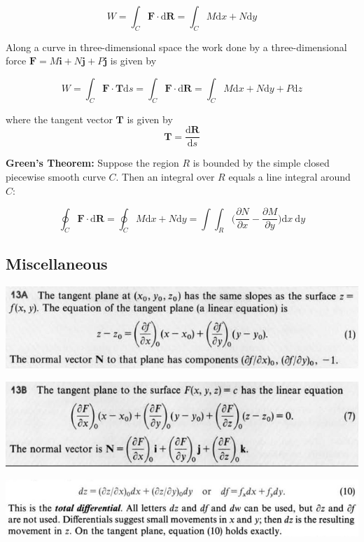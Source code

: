 \documentclass{article}
\begin{document}
\[
W = \int_C \boldsymbol{F} \cdot \text{d}\boldsymbol{R} = \int_C M \text{d}x + N \text{d} y
\]

Along a curve in three-dimensional space the work done by a three-dimensional force \(\boldsymbol{F} = M\boldsymbol{i} + N \boldsymbol{j} + P \boldsymbol{j}\) is given by

\[
W = \int_C \boldsymbol{F} \cdot \boldsymbol{T} \text{d}s = \int_C \boldsymbol{F} \cdot \text{d}\boldsymbol{R} = \int_C M \text{d}x + N \text{d}y + P \text{d}z
\]

where the tangent vector \(\boldsymbol{T}\) is given by \[\boldsymbol{T} = \frac{\text{d}\boldsymbol{R}}{\text{d}s}\]

\textbf{Green's Theorem:} Suppose the region \(R\) is bounded by the simple closed piecewise smooth curve \(C\). Then an integral over \(R\) equals a line integral around \(C\):

\[
\oint_C \boldsymbol{F} \cdot \text{d}\boldsymbol{R} = \oint_C M \text{d}x + N \text{d}y = \int \int_R \bigg( \frac{\partial N}{\partial x} - \frac{\partial M}{\partial y} \bigg) \text{d}x \ \text{d}y
\]

\subsection{Miscellaneous}

\includegraphics[scale=0.65]{tangent_plane}

\includegraphics[scale=0.65]{tangent_plane2}

\includegraphics[scale=0.55]{total_differential}
\end{document}

